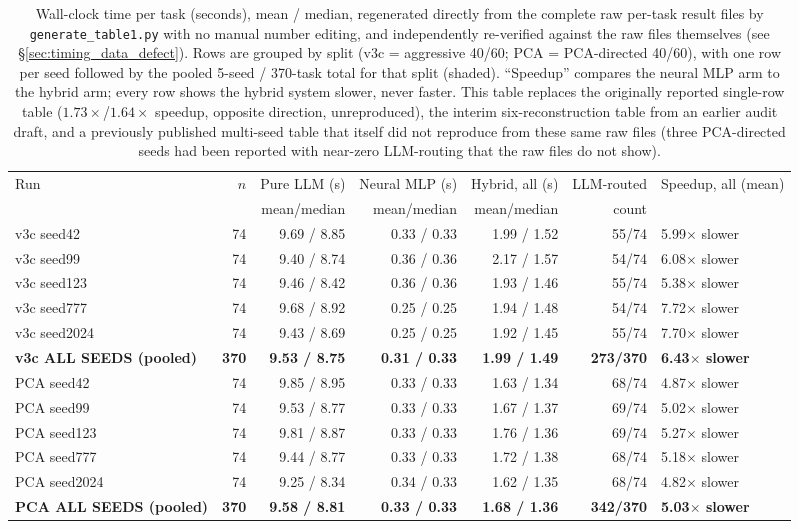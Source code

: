 \documentclass[twoside,11pt]{article}
\begin{document}
\begin{table}[htbp]
\centering
\small
\caption{Wall-clock time per task (seconds), mean / median, regenerated
directly from the complete raw per-task result files by
\texttt{generate\_table1.py} with no manual number editing, and
independently re-verified against the raw files themselves (see
\S\ref{sec:timing_data_defect}). Rows are grouped by split (v3c =
aggressive 40/60; PCA = PCA-directed 40/60), with one row per seed
followed by the pooled 5-seed / 370-task total for that split (shaded).
``Speedup'' compares the neural MLP arm to the hybrid arm; every row
shows the hybrid system slower, never faster. This table replaces the
originally reported single-row table ($1.73\times$/$1.64\times$ speedup,
opposite direction, unreproduced), the interim six-reconstruction table
from an earlier audit draft, and a previously published multi-seed table
that itself did not reproduce from these same raw files (three
PCA-directed seeds had been reported with near-zero LLM-routing that the
raw files do not show).}
\label{tab:timing_full}
\begin{tabular}{lrrrrrl}
\toprule
Run & $n$ & Pure LLM (s) & Neural MLP (s) & Hybrid, all (s) & LLM-routed & Speedup, all (mean) \\
    &     & mean/median  & mean/median    & mean/median      & count      &  \\
\midrule
v3c seed42  & 74 & 9.69 / 8.85 & 0.33 / 0.33 & 1.99 / 1.52 & 55/74 & 5.99$\times$ slower \\
v3c seed99  & 74 & 9.40 / 8.74 & 0.36 / 0.36 & 2.17 / 1.57 & 54/74 & 6.08$\times$ slower \\
v3c seed123 & 74 & 9.46 / 8.42 & 0.36 / 0.36 & 1.93 / 1.46 & 55/74 & 5.38$\times$ slower \\
v3c seed777 & 74 & 9.68 / 8.92 & 0.25 / 0.25 & 1.94 / 1.48 & 54/74 & 7.72$\times$ slower \\
v3c seed2024 & 74 & 9.43 / 8.69 & 0.25 / 0.25 & 1.92 / 1.45 & 55/74 & 7.70$\times$ slower \\
\rowcolor{black!8}
\textbf{v3c ALL SEEDS (pooled)} & \textbf{370} & \textbf{9.53 / 8.75} & \textbf{0.31 / 0.33} & \textbf{1.99 / 1.49} & \textbf{273/370} & \textbf{6.43$\times$ slower} \\
PCA seed42  & 74 & 9.85 / 8.95 & 0.33 / 0.33 & 1.63 / 1.34 & 68/74 & 4.87$\times$ slower \\
PCA seed99  & 74 & 9.53 / 8.77 & 0.33 / 0.33 & 1.67 / 1.37 & 69/74 & 5.02$\times$ slower \\
PCA seed123 & 74 & 9.81 / 8.87 & 0.33 / 0.33 & 1.76 / 1.36 & 69/74 & 5.27$\times$ slower \\
PCA seed777 & 74 & 9.44 / 8.77 & 0.33 / 0.33 & 1.72 / 1.38 & 68/74 & 5.18$\times$ slower \\
PCA seed2024 & 74 & 9.25 / 8.34 & 0.34 / 0.33 & 1.62 / 1.35 & 68/74 & 4.82$\times$ slower \\
\rowcolor{black!8}
\textbf{PCA ALL SEEDS (pooled)} & \textbf{370} & \textbf{9.58 / 8.81} & \textbf{0.33 / 0.33} & \textbf{1.68 / 1.36} & \textbf{342/370} & \textbf{5.03$\times$ slower} \\
\bottomrule
\end{tabular}
\end{table}
\end{document}
